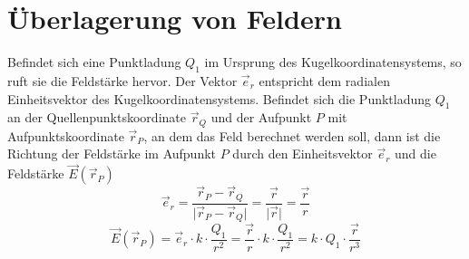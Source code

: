\section{Überlagerung von Feldern}
Befindet sich eine Punktladung $Q_1$ im Ursprung des Kugelkoordinatensystems, so ruft sie die Feldstärke hervor. Der Vektor $\overrightarrow{e}_r$ entspricht dem radialen Einheitsvektor des Kugelkoordinatensystems. Befindet sich die Punktladung $Q_1$ an der Quellenpunktskoordinate $\overrightarrow{r}_Q$ und der Aufpunkt $P$ mit Aufpunktskoordinate $\overrightarrow{r}_P$, an dem das Feld berechnet werden soll, dann ist die Richtung der Feldstärke im Aufpunkt $P$ durch den Einheitsvektor $\overrightarrow{e}_r$ und die Feldstärke $\overrightarrow{E}\left(\overrightarrow{r}_P\right)$
\begin{equation}
\boxed{\overrightarrow{e}_r=\dfrac{\overrightarrow{r}_P-\overrightarrow{r}_Q}{\Big\vert\overrightarrow{r}_P-\overrightarrow{r}_Q\Big\vert}=\dfrac{\overrightarrow{r}}{\Big\vert \overrightarrow{r}\Big\vert}=\dfrac{\overrightarrow{r}}{r}}
\end{equation}
\begin{equation}
\boxed{\overrightarrow{E}\left(\overrightarrow{r}_P\right)=\overrightarrow{e}_r\cdot k\cdot \dfrac{Q_1}{r^2}=\dfrac{\overrightarrow{r}}{r}\cdot k\cdot \dfrac{Q_1}{r^2}=k\cdot Q_1\cdot \dfrac{\overrightarrow{r}}{r^3}}
\end{equation}
